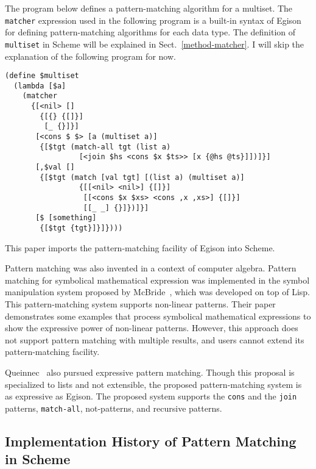 \documentclass[acmlarge]{acmart}
\newcommand{\todo}[1]{\textcolor{red}{(TODO: #1)}}
\newcommand{\new}[1]{\textcolor{blue}{#1}}
\begin{document}
The program below defines a pattern-matching algorithm for a multiset.
The \lstinline{matcher} expression used in the following program is a built-in syntax of Egison for defining pattern-matching algorithms for each data type.
The definition of \lstinline{multiset} in Scheme will be explained in Sect.~\ref{method-matcher}.
I will skip the explanation of the following program for now.

\begin{lstlisting}[language=egison]
(define $multiset
  (lambda [$a]
    (matcher
      {[<nil> []
        {[{} {[]}]
         [_ {}]}]
       [<cons $ $> [a (multiset a)]
        {[$tgt (match-all tgt (list a)
                 [<join $hs <cons $x $ts>> [x {@hs @ts}]])]}]
       [,$val []
        {[$tgt (match [val tgt] [(list a) (multiset a)]
                 {[[<nil> <nil>] {[]}]
                  [[<cons $x $xs> <cons ,x ,xs>] {[]}]
                  [[_ _] {}]})]}]
       [$ [something]
        {[$tgt {tgt}]}]})))
\end{lstlisting}

\noindent This paper imports the pattern-matching facility of Egison into Scheme.

\medskip

Pattern matching was also invented in a context of computer algebra.
Pattern matching for symbolical mathematical expression was implemented in the symbol manipulation system proposed by McBride~\cite{mcbride1969symbol}, which was developed on top of Lisp.
This pattern-matching system supports non-linear patterns.
Their paper demonstrates some examples that process symbolical mathematical expressions to show the expressive power of non-linear patterns.
However, this approach does not support pattern matching with multiple results, and users cannot extend its pattern-matching facility.

Queinnec~\cite{queinnec1990compilation} also pursued expressive pattern matching.
Though this proposal is specialized to lists and not extensible, the proposed pattern-matching system is as expressive as Egison.
The proposed system supports the \lstinline{cons} and the \lstinline{join} patterns, \lstinline{match-all}, not-patterns, and recursive patterns.


\subsection{Implementation History of Pattern Matching in Scheme}\label{history2}
\end{document}

